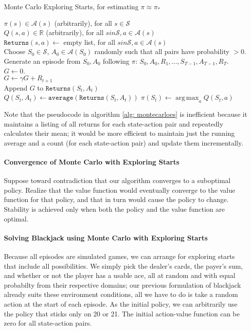 \documentclass[12pt]{article}
\DeclareMathOperator*{\argmax}{arg\,max}
\begin{document}
\begin{algorithm}[h]
  \caption{Monte Carlo Exploring Starts, for estimating $\pi \approx \pi_*$}
  $\pi(s) \in \mathcal A(s)$ (arbitrarily), for all $s \in \mathcal S$ \\
  $Q(s,a) \in \mathbb R$ (arbitrarily), for all $s in \mathcal S, a \in \mathcal   A(s)$ \\
  $\texttt{Returns}(s,a) \gets$ empty list, for all $s in \mathcal S, a \in   \mathcal   A(s)$ \\
 {
  Choose $S_0 \in \mathcal S$, $A_0 \in \mathcal A(S_0)$ randomly such that all   pairs have probability $>0$. \\
  Generate an episode from $S_0, A_0$ following $\pi$: $S_0, A_0, R_1, \ldots,   S_{T-1}, A_{T-1}, R_T$.\\
  $G \gets 0$. \\
   {
    $G \gets \gamma G + R_{t+1}$ \\
     {
Append $G$ to $\texttt{Returns}(S_t, A_t)$ \\
$Q(S_t, A_t) \gets \texttt{average}(\texttt{Returns}(S_t, A_t))$ 
$\pi(S_t) \gets \argmax_a Q(S_t, a)$ \hspace{61pt} 
    }
  }
}
\label{alg: montecarloes}
\end{algorithm}
Note that the pseudocode in algorithm \ref{alg: montecarloes} is inefficient because it maintains a listing of all returns for each state-action pair and repeatedly calculates their mean; it would be more efficient to maintain just the running average and a count (for each state-action pair) and update them incrementally.

\paragraph{Convergence of Monte Carlo with Exploring Starts}
Suppose toward contradiction that our algorithm converges to a suboptimal policy. Realize that the value function would eventually converge to the value function for that policy, and that in turn would cause the policy to change. Stability is achieved only when both the policy and the value function are optimal.

\paragraph{Solving Blackjack using Monte Carlo with Exploring Starts} Because all episodes are simulated games, we can arrange for exploring starts that include all possibilities. We simply pick the dealer's cards, the payer's sum, and whether or not the player has a usable ace, all at random and with equal probabilty from their respective domains; our previous formulation of blackjack already suits these environment conditions, all we have to do is take a random action at the start of each episode. As the initial policy, we can arbitrarily use the policy that sticks only on 20 or 21. The initial action-value function can be zero for all state-action pairs. 
\end{document}
